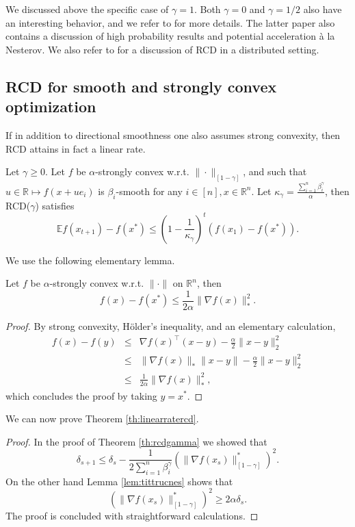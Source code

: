 \documentclass[openany]{now}
\newcommand{\E}{\mathbb{E}}
\newcommand{\R}{\mathbb{R}}
\begin{document}
We discussed above the specific case of $\gamma = 1$. Both $\gamma=0$ and $\gamma=1/2$ also have an interesting behavior, and we refer to \cite{Nes12} for more details. The latter paper also contains a discussion of high probability results and potential acceleration \`a la Nesterov. We also refer to \cite{RT12} for a discussion of RCD in a distributed setting.

\subsection{RCD for smooth and strongly convex optimization}
If in addition to directional smoothness one also assumes strong convexity, then RCD attains in fact a linear rate.
\begin{theorem} \label{th:linearratercd}
Let $\gamma \geq 0$. Let $f$ be $\alpha$-strongly convex w.r.t. $\|\cdot\|_{[1-\gamma]}$, and such that $u \in \R \mapsto f(x + u e_i)$ is $\beta_i$-smooth for any $i \in [n], x \in \R^n$. Let $\kappa_{\gamma} = \frac{\sum_{i=1}^n \beta_i^{\gamma}}{\alpha}$, then RCD($\gamma$) satisfies
$$\E f(x_{t+1}) - f(x^*) \leq \left(1 - \frac1{\kappa_{\gamma}}\right)^t (f(x_1) - f(x^*)) .$$
\end{theorem}
We use the following elementary lemma.
\begin{lemma} \label{lem:tittrucnes}
Let $f$ be $\alpha$-strongly convex w.r.t. $\| \cdot\|$ on $\R^n$, then
$$f(x) - f(x^*) \leq \frac1{2\alpha} \|\nabla f(x)\|_*^2 .$$
\end{lemma}
\begin{proof}
By strong convexity, H{\"o}lder's inequality, and an elementary calculation,
\begin{eqnarray*}
f(x) - f(y) & \leq & \nabla f(x)^{\top} (x-y) - \frac{\alpha}{2} \|x-y\|_2^2 \\
& \leq & \|\nabla f(x)\|_* \|x-y\| - \frac{\alpha}{2} \|x-y\|_2^2 \\
& \leq & \frac1{2\alpha} \|\nabla f(x)\|_*^2 ,
\end{eqnarray*}
which concludes the proof by taking $y = x^*$.
\end{proof}
We can now prove Theorem \ref{th:linearratercd}.
\begin{proof}
In the proof of Theorem \ref{th:rcdgamma} we showed that 
$$\delta_{s+1} \leq \delta_s - \frac{1}{2 \sum_{i=1}^n \beta_i^{\gamma}} \left(\|\nabla f(x_s)\|_{[1-\gamma]}^*\right)^2 .$$
On the other hand Lemma \ref{lem:tittrucnes} shows that 
$$\left(\|\nabla f(x_s)\|_{[1-\gamma]}^*\right)^2 \geq 2 \alpha \delta_s .$$
The proof is concluded with straightforward calculations.
\end{proof}
\end{document}
